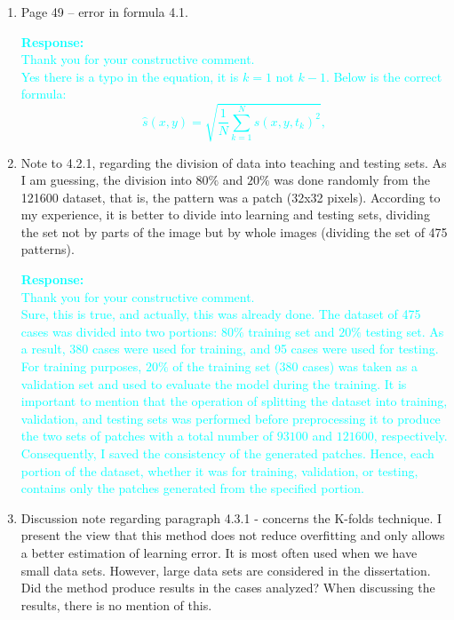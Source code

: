 \documentclass[11pt,a2paper]{report}
\begin{document}
{\begin{enumerate}
		\item Page 49 – error in formula 4.1.
		
		\textcolor{Cyan}{
			\textbf{Response:} \\
			Thank you for your constructive comment. \\
			Yes there is a typo in the equation, it is \(k=1\) not \(k-1\).
			Below is the correct formula:
			\begin{equation}
				\hat{s}(x,y) = \sqrt{\frac{1}{N}\sum_{k=1}^{N}s(x,y,t_k)^2}, 
				\label{eqn:rms} 
			\end{equation}
		}		
	
		\item Note to 4.2.1, regarding the division of data into teaching and testing sets. 
		As I am guessing, the division into \(80\%\) and \(20\%\) was done randomly from the 121600 dataset, that is, the pattern was a patch (32x32 pixels). 
		According to my experience, it is better to divide into learning and testing sets, dividing the set not by parts of the image but by whole images (dividing the set of 475 patterns).
		
		\textcolor{Cyan}{
			\textbf{Response:} \\
			Thank you for your constructive comment. \\
			Sure, this is true, and actually, this was already done.
			The dataset of 475 cases was divided into two portions: $80\%$ training set and $20\%$ testing set.
			As a result, 380 cases were used for training, and 95 cases were used for testing.
			For training purposes, \(20\%\) of the training set (\(380\) cases) was taken as a validation set and used to evaluate the model during the training.
			It is important to mention that the operation of splitting the dataset into training, validation, and testing sets was performed before preprocessing it to produce the two sets of patches with a total number of \(93100\) and \(121600\), respectively.
			Consequently, I saved the consistency of the generated patches.
			Hence, each portion of the dataset, whether it was for training, validation, or testing, contains only the patches generated from the specified portion.
		}
	
		\item Discussion note regarding paragraph 4.3.1 - concerns the K-folds technique. 
		I present the view that this method does not reduce overfitting and only allows a better estimation of learning error. 
		It is most often used when we have small data sets. 
		However, large data sets are considered in the dissertation. 
		Did the method produce results in the cases analyzed? When discussing the results, there is no mention of this.
		

\end{enumerate}}
\end{document}
